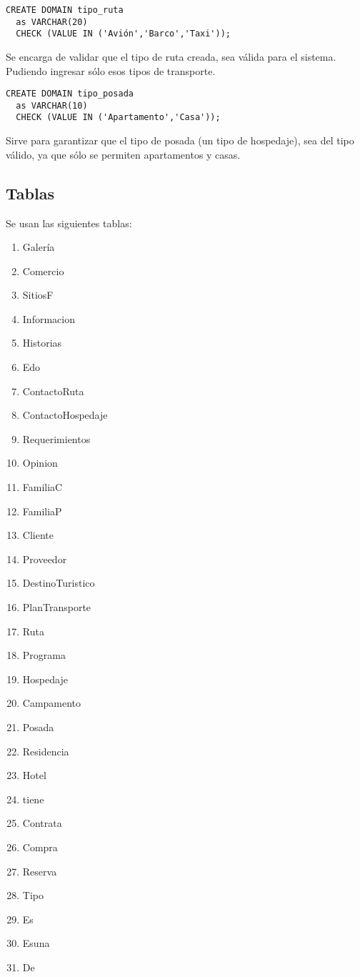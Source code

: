 \documentclass{article}
\begin{document}
\begin{lstlisting}
CREATE DOMAIN tipo_ruta
  as VARCHAR(20)
  CHECK (VALUE IN ('Avión','Barco','Taxi'));
\end{lstlisting}
Se encarga de validar que el tipo de ruta creada, sea válida para el sistema. Pudiendo ingresar sólo esos tipos de transporte.

\begin{lstlisting}
CREATE DOMAIN tipo_posada
  as VARCHAR(10)
  CHECK (VALUE IN ('Apartamento','Casa'));
\end{lstlisting}
Sirve para garantizar que el tipo de posada (un tipo de hospedaje), sea del tipo válido, ya que sólo se permiten apartamentos y casas.
\subsection{Tablas}
Se usan las siguientes tablas:
\begin{enumerate}
    \item Galería
    \item Comercio
    \item Sitios\textunderscore F
    \item Informacion
    \item Historias
    \item Edo
    \item Contacto\textunderscore Ruta
    \item Contacto\textunderscore Hospedaje
    \item Requerimientos
    \item Opinion
    \item Familia\textunderscore C
    \item Familia\textunderscore P
    \item Cliente
    \item Proveedor
    \item Destino\textunderscore Turistico
    \item Plan\textunderscore Transporte
    \item Ruta
    \item Programa
    \item Hospedaje
    \item Campamento
    \item Posada
    \item Residencia
    \item Hotel
    \item tiene
    \item Contrata
    \item Compra
    \item Reserva
    \item Tipo
    \item Es
    \item Es\textunderscore una
    \item De
\end{enumerate}
\end{document}
